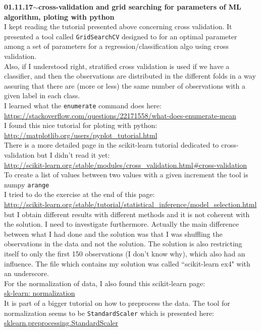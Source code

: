 \documentclass[11pt,a4paper]{article}
\newenvironment{loggentry}[2]%
{\noindent\textbf{#1}\hspace{1cm}$\mathbf{\sim}$\text{ }\textbf{#2}\\}{\vspace{0.5cm}}
\begin{document}
\begin{loggentry}{01.11.17}{cross-validation and grid searching for parameters of ML algorithm, ploting with python}
I kept reading the tutorial presented above concerning cross validation. It presented a tool called \texttt{GridSearchCV} designed to for an optimal parameter among a set of parameters for a regression/classification algo using cross validation.\\
Also, if I understood right, stratified cross validation is used if we have a classifier, and then the observations are distributed in the different folds in a way assuring that there are (more or less) the same number of observations with a given label in each class.\\
I learned what the \texttt{enumerate} command does here:\\
\url{https://stackoverflow.com/questions/22171558/what-does-enumerate-mean}\\
I found this nice tutorial for ploting with python:\\
\url{http://matplotlib.org/users/pyplot_tutorial.html}\\
There is a more detailed page in the scikit-learn tutorial dedicated to cross-validation but I didn't read it yet:\\
\url{http://scikit-learn.org/stable/modules/cross_validation.html#cross-validation}\\
To create a list of values between two values with a given increment the tool is numpy \texttt{arange}\\
I tried to do the exercise at the end of this page:\\
\url{http://scikit-learn.org/stable/tutorial/statistical_inference/model_selection.html}\\
but I obtain different results with different methods and it is not coherent with the solution. I need to investigate furthermore. Actually the main difference between what I had done and the solution was that I was shuffling the observations in the data and not the solution. The solution is also restricting itself to only the first 150 observations (I don't know why), which also had an influence. The file which contains my solution was called ``scikit-learn ex4" with an underscore.\\
For the normalization of data, I also found this scikit-learn page:\\
\href{http://scikit-learn.org/stable/modules/preprocessing.html#preprocessing-normalization}{sk-learn: normalization}\\
It is part of a bigger tutorial on how to preprocess the data. The tool for normalization seems to be \texttt{StandardScaler} which is presented here:\\
\href{http://scikit-learn.org/stable/modules/generated/sklearn.preprocessing.StandardScaler.html}{sklearn.preprocessing.StandardScaler}
\end{loggentry}
\end{document}
